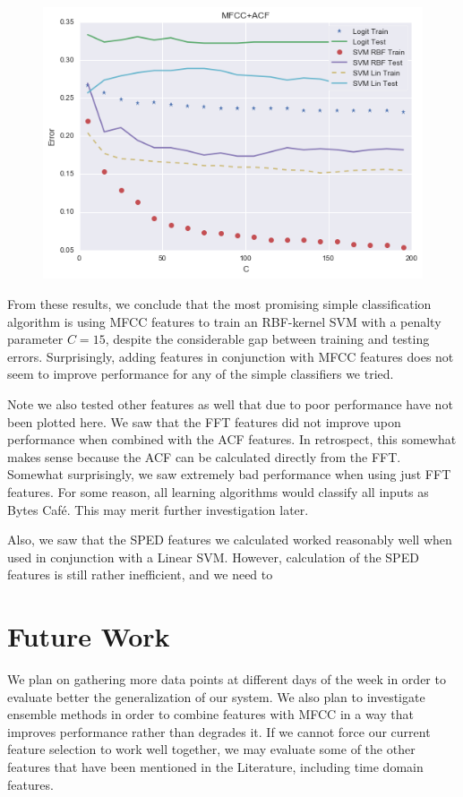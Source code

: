 \documentclass[journal]{IEEEtran}
\begin{document}
\begin{figure}[H]
\centering
\includegraphics[width=0.45\linewidth]{MFCC_ACF_Err}
\end{figure}
From these results, we conclude that the most promising simple classification algorithm is using MFCC features to train an RBF-kernel SVM with a penalty parameter $C=15$, despite the considerable gap between training and testing errors. Surprisingly, adding features in conjunction with MFCC features does not seem to improve performance for any of the simple classifiers we tried.

Note we also tested other features as well that due to poor performance have not been plotted here. We saw that the FFT features did not improve upon performance when combined with the ACF features. In retrospect, this somewhat makes sense because the ACF can be calculated directly from the FFT. Somewhat surprisingly, we saw extremely bad performance when using just FFT features. For some reason, all learning algorithms would classify all inputs as Bytes Caf\'e. This may merit further investigation later.

Also, we saw that the SPED features we calculated worked reasonably well when used in conjunction with a Linear SVM. However, calculation of the SPED features is still rather inefficient, and we need to 

\section{Future Work}
We plan on gathering more data points at different days of the week in order to evaluate better the generalization of our system. We also plan to investigate ensemble methods in order to combine features with MFCC in a way that improves performance rather than degrades it. If we cannot force our current feature selection to work well together, we may evaluate some of the other features that have been mentioned in the Literature, including time domain features.



%
%
%


\raggedbottom
\end{document}
